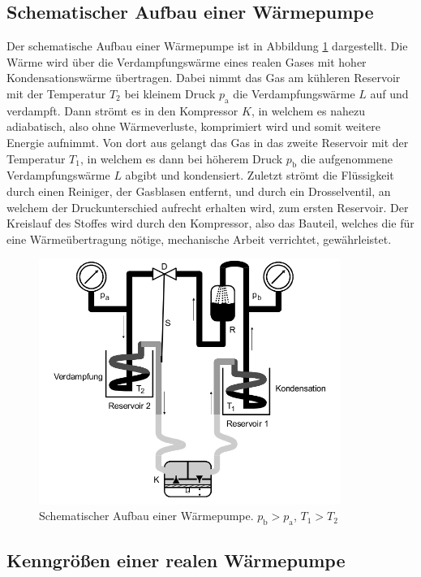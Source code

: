 \subsection{Schematischer Aufbau einer Wärmepumpe}

Der schematische Aufbau einer Wärmepumpe ist in Abbildung
\ref{fig:WaermepumpeSchematisch} dargestellt.
Die Wärme wird über die Verdampfungswärme eines realen Gases mit
hoher Kondensationswärme übertragen. Dabei nimmt das Gas am kühleren
Reservoir mit der Temperatur $T_2$ bei kleinem Druck $p_\text{a}$ die
Verdampfungswärme
$L$ auf und verdampft. Dann strömt es in den Kompressor $K$, in welchem es nahezu
adiabatisch, also ohne Wärmeverluste, komprimiert wird und somit weitere Energie
aufnimmt.
Von dort aus gelangt das Gas in das zweite Reservoir mit der Temperatur $T_1$,
in welchem es dann bei
höherem Druck $p_\text{b}$ die aufgenommene Verdampfungswärme $L$ abgibt und
kondensiert. Zuletzt strömt die Flüssigkeit durch einen Reiniger, der
Gasblasen entfernt, und durch ein Drosselventil, an welchem der Druckunterschied
aufrecht erhalten wird, zum ersten Reservoir.
Der Kreislauf des Stoffes wird durch den Kompressor, also das Bauteil, welches
die für eine Wärmeübertragung nötige, mechanische Arbeit verrichtet,
gewährleistet.

\begin{figure}
  \centering
  \includegraphics[height = 8cm]{WaermepumpeSchematisch.png}
  \caption{Schematischer Aufbau einer Wärmepumpe. $p_\text{b} > p_\text{a}$,
  $T_1 > T_2$ \cite{anleitung}}
  \label{fig:WaermepumpeSchematisch}
\end{figure}

\subsection{Kenngrößen einer realen Wärmepumpe}


